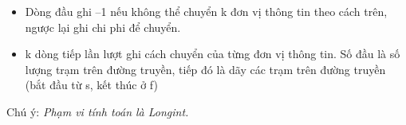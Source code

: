 \begin{itemize}
	\item Dòng đầu ghi –1 nếu không thể chuyển k đơn vị thông tin theo cách trên, ngược lại ghi chi phi để chuyển.
	\item k dòng tiếp lần lượt ghi cách chuyển của từng đơn vị thông tin. Số đầu là số lượng trạm trên đường truyền, tiếp đó là dãy các trạm trên đường truyền (bắt đầu từ s, kết thúc ở f)
\end{itemize}

Chú ý: \emph{ Phạm vi tính toán là Longint. }